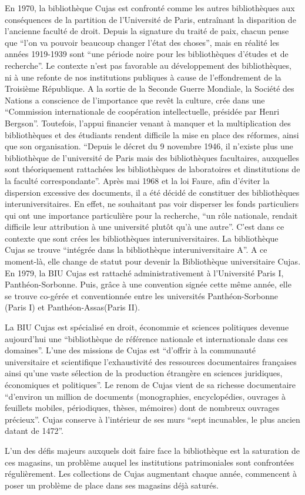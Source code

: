 En 1970, la bibliothèque Cujas est confronté comme les autres bibliothèques aux conséquences de la partition de l'Université de Paris, entraînant la disparition de l'ancienne faculté de droit. Depuis la signature du traité de paix, chacun pense que \enquote{l'on va pouvoir beaucoup changer l'état des choses}, mais en réalité les années 1919-1939 sont \enquote{une période noire pour les bibliothèques d'études et de recherche}. Le contexte n'est pas favorable au développement des bibliothèques, ni à une refonte de nos institutions publiques à cause de l'effondrement de la Troisième République. A la sortie de la Seconde Guerre Mondiale, la Société des Nations a conscience de l'importance que revêt la culture, crée dans une \enquote{Commission internationale de coopération intellectuelle, présidée par Henri Bergson}. Toutefois, l'appui financier venant à manquer et la multiplication des bibliothèques et des étudiants rendent difficile la mise en place des réformes, ainsi que son organisation. \enquote{Depuis le décret du 9 novembre 1946, il n'existe plus une bibliothèque de l'université de Paris mais des bibliothèques facultaires, auxquelles sont théoriquement rattachées les bibliothèques de laboratoires et dinstitutions de la faculté correspondante}. Après mai 1968 et la loi Faure, afin d'éviter la dispersion excessive des documents, il a été décidé de constituer des bibliothèques interuniversitaires. En effet, ne souhaitant pas voir disperser les fonds particuliers qui ont une importance particulière pour la recherche, \enquote{un rôle nationale, rendait difficile leur attribution à une université plutôt qu'à une autre}. C'est dans ce contexte que sont crées les bibliothèques interuniversitaires. La bibliothèque Cujas se trouve \enquote{intégrée dans la bibliothèque interuniversitaire A}. A ce moment-là, elle change de statut pour devenir la Bibliothèque universitaire Cujas. En 1979, la BIU Cujas est rattaché administrativement à l'Université Paris I, Panthéon-Sorbonne. Puis, grâce à une convention signée cette même année, elle se trouve co-gérée et conventionnée entre les universités Panthéon-Sorbonne (Paris I) et Panthéon-Assas(Paris II).

La BIU Cujas est spécialisé en droit, économmie et sciences politiques devenue aujourd'hui une \enquote{bibliothèque de référence nationale et internationale dans ces domaines}.
L'une des missions de Cujas est \enquote{d'offrir à la communauté universitaire et scientifique l'exhaustivité des ressources documentaires françaises ainsi qu'une vaste sélection de la production étrangère en sciences juridiques, économiques et politiques}. Le renom de Cujas vient de sa richesse documentaire \enquote{d'environ un million de documents (monographies, encyclopédies, ouvrages à feuillets mobiles, périodiques, thèses, mémoires) dont de nombreux ouvrages précieux}. Cujas conserve à l'intérieur de ses murs \enquote{sept incunables, le plus ancien datant de 1472}.

L'un des défis majeurs auxquels doit faire face la bibliothèque est la saturation de ces magasins, un problème auquel les institutions patrimoniales sont confrontées régulièrement. Les collections de Cujas augmentant chaque année, commencent à poser un problème de place dans ses magasins déjà saturés.